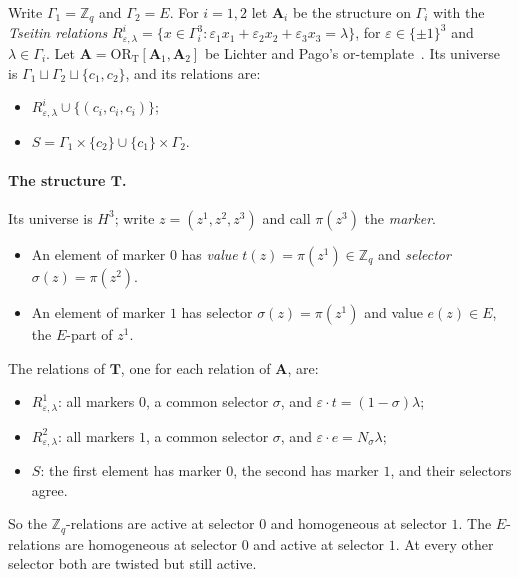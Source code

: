 \documentclass[11pt]{article}
\theoremstyle{definition}
\theoremstyle{remark}
\newcommand{\Z}{\mathbb Z}
\newcommand{\ORT}{\mathrm{OR}_{\mathrm T}}
\begin{document}
Write $\Gamma_1=\Z_q$ and $\Gamma_2=E$. For $i=1,2$ let $\mathbf A_i$ be the
structure on $\Gamma_i$ with the \emph{Tseitin relations}
$R^i_{\varepsilon,\lambda}=\{x\in\Gamma_i^3:\varepsilon_1x_1+\varepsilon_2x_2+\varepsilon_3x_3=\lambda\}$,
for $\varepsilon\in\{\pm1\}^3$ and $\lambda\in\Gamma_i$. Let $\mathbf
A=\ORT[\mathbf A_1,\mathbf A_2]$ be Lichter and Pago's or-template~\cite[\S3.1]{LP25}.
Its universe is $\Gamma_1\sqcup\Gamma_2\sqcup\{c_1,c_2\}$, and its relations are:
\begin{itemize}
\item $R^i_{\varepsilon,\lambda}\cup\{(c_i,c_i,c_i)\}$;
\item $S=\Gamma_1\times\{c_2\}\cup\{c_1\}\times\Gamma_2$.
\end{itemize}

\paragraph{The structure $\mathbf T$.} Its universe is $H^3$; write
$z=(z^1,z^2,z^3)$ and call $\pi(z^3)$ the \emph{marker}.
\begin{itemize}
\item An element of marker $0$ has \emph{value} $t(z)=\pi(z^1)\in\Z_q$ and
\emph{selector} $\sigma(z)=\pi(z^2)$.
\item An element of marker $1$ has selector $\sigma(z)=\pi(z^1)$ and value
$e(z)\in E$, the $E$-part of $z^1$.
\end{itemize}
The relations of $\mathbf T$, one for each relation of $\mathbf A$, are:
\begin{itemize}
\item[] $R^1_{\varepsilon,\lambda}$: all markers $0$, a common selector $\sigma$,
and $\varepsilon\cdot t=(1-\sigma)\lambda$;
\item[] $R^2_{\varepsilon,\lambda}$: all markers $1$, a common selector $\sigma$,
and $\varepsilon\cdot e=N_\sigma\lambda$;
\item[] $S$: the first element has marker $0$, the second has marker $1$, and
their selectors agree.
\end{itemize}
So the $\Z_q$-relations are active at selector $0$ and homogeneous at selector $1$.
The $E$-relations are homogeneous at selector $0$ and active at selector $1$.
At every other selector both are twisted but still active.
\end{document}
